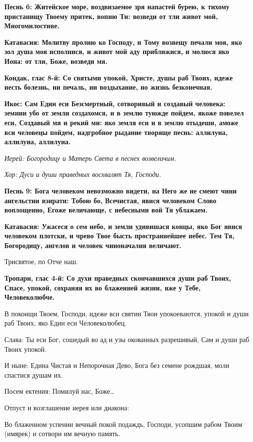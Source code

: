 \bfseries Песнь 6:\normalfont{} Житейское море, воздвизаемое зря напастей бурею, к тихому пристанищу Твоему притек, вопию Ти: возведи от тли живот мой, Многомилостиве. 

\bfseries Катавасия:\normalfont{} Молитву пролию ко Господу, и Тому возвещу печали моя, яко зол душа моя исполнися, и живот мой аду приближися, и молюся яко Иона: от тли, Боже, возведи мя. 

\bfseries Кондак, глас 8-й:\normalfont{} Со святыми упокой, Христе, душы раб Твоих, идеже несть болезнь, ни печаль, ни воздыхание, но жизнь безконечная. 

\bfseries Икос:\normalfont{} Сам Един еси Безсмертный, сотворивый и создавый человека: земнии убо от земли создахомся, и в землю туюжде пойдем, якоже повелел еси, Создавый мя и рекий ми: яко земля еси и в землю отыдеши, аможе вси человецы пойдем, надгробное рыдание творяще песнь: аллилуиа, аллилуиа, аллилуиа. 

\itshape Иерей:\normalfont{} Богородицу и Матерь Света в песнех возвеличим. 

\itshape Хор:\normalfont{} Дуси и души праведных восхвалят Тя, Господи. 

\bfseries Песнь 9:\normalfont{} Бога человеком невозможно видети, на Него же не смеют чини ангельстии взирати: Тобою бо, Всечистая, явися человеком Слово воплощенно, Егоже величающе, с небесными вой Тя ублажаем. 

\bfseries Катавасия:\normalfont{} Ужасеся о сем небо, и земли удивишася концы, яко Бог явися человеком плотски, и чрево Твое бысть пространнейшее небес. Тем Тя, Богородицу, ангелов и человек чиноначалия величают. 

Трисвятое, по Отче наш. 

\bfseries Тропари, глас 4-й:\normalfont{} Со духи праведных скончавшихся души раб Твоих, Спасе, упокой, сохраняя их во блаженней жизни, яже у Тебе, Человеколюбче. 

В покоищи Твоем, Господи, идеже вси святии Твои упокоеваются, упокой и души раб Твоих, яко Един еси Человеколюбец. 

Слава: Ты еси Бог, сошедый во ад и узы окованных разрешивый, Сам и души раб Твоих упокой. 

И ныне: Едина Чистая и Непорочная Дево, Бога без семене рождшая, моли спастися душам их. 

Посем ектения: Помилуй нас, Боже… 

Отпуст и возглашение иерея или диакона: 

Во блаженном успении вечный покой подаждь, Господи, усопшим рабом Твоим (имярек) и сотвори им вечную память. 

